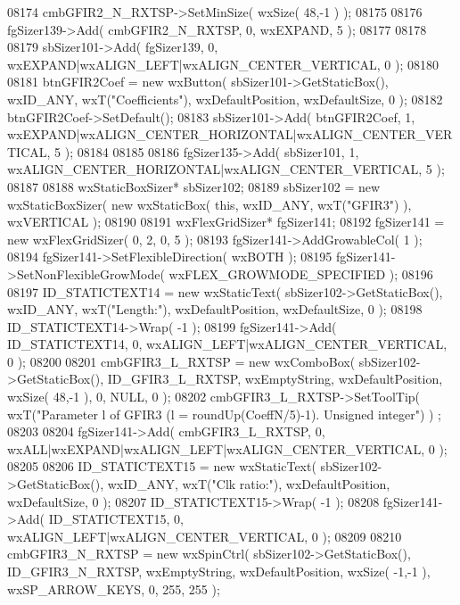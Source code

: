 \begin{DoxyCode}
08174     cmbGFIR2_N_RXTSP->SetMinSize( wxSize( 48,-1 ) );
08175     
08176     fgSizer139->Add( cmbGFIR2_N_RXTSP, 0, wxEXPAND, 5 );
08177     
08178     
08179     sbSizer101->Add( fgSizer139, 0, wxEXPAND|wxALIGN\_LEFT|wxALIGN\_CENTER\_VERTICAL, 0 );
08180     
08181     btnGFIR2Coef = \textcolor{keyword}{new} wxButton( sbSizer101->GetStaticBox(), wxID\_ANY, wxT(\textcolor{stringliteral}{"Coefficients"}), 
      wxDefaultPosition, wxDefaultSize, 0 );
08182     btnGFIR2Coef->SetDefault(); 
08183     sbSizer101->Add( btnGFIR2Coef, 1, wxEXPAND|wxALIGN\_CENTER\_HORIZONTAL|wxALIGN\_CENTER\_VERTICAL, 5 );
08184     
08185     
08186     fgSizer135->Add( sbSizer101, 1, wxALIGN\_CENTER\_HORIZONTAL|wxALIGN\_CENTER\_VERTICAL, 5 );
08187     
08188     wxStaticBoxSizer* sbSizer102;
08189     sbSizer102 = \textcolor{keyword}{new} wxStaticBoxSizer( \textcolor{keyword}{new} wxStaticBox( \textcolor{keyword}{this}, wxID\_ANY, wxT(\textcolor{stringliteral}{"GFIR3"}) ), wxVERTICAL );
08190     
08191     wxFlexGridSizer* fgSizer141;
08192     fgSizer141 = \textcolor{keyword}{new} wxFlexGridSizer( 0, 2, 0, 5 );
08193     fgSizer141->AddGrowableCol( 1 );
08194     fgSizer141->SetFlexibleDirection( wxBOTH );
08195     fgSizer141->SetNonFlexibleGrowMode( wxFLEX\_GROWMODE\_SPECIFIED );
08196     
08197     ID_STATICTEXT14 = \textcolor{keyword}{new} wxStaticText( sbSizer102->GetStaticBox(), wxID\_ANY, wxT(\textcolor{stringliteral}{"Length:"}), 
      wxDefaultPosition, wxDefaultSize, 0 );
08198     ID_STATICTEXT14->Wrap( -1 );
08199     fgSizer141->Add( ID_STATICTEXT14, 0, wxALIGN\_LEFT|wxALIGN\_CENTER\_VERTICAL, 0 );
08200     
08201     cmbGFIR3_L_RXTSP = \textcolor{keyword}{new} wxComboBox( sbSizer102->GetStaticBox(), 
      ID_GFIR3_L_RXTSP, wxEmptyString, wxDefaultPosition, wxSize( 48,-1 ), 0, NULL, 0 ); 
08202     cmbGFIR3_L_RXTSP->SetToolTip( wxT(\textcolor{stringliteral}{"Parameter l of GFIR3 (l = roundUp(CoeffN/5)-1). Unsigned integer"}) )
      ;
08203     
08204     fgSizer141->Add( cmbGFIR3_L_RXTSP, 0, wxALL|wxEXPAND|wxALIGN\_LEFT|wxALIGN\_CENTER\_VERTICAL, 0 );
08205     
08206     ID_STATICTEXT15 = \textcolor{keyword}{new} wxStaticText( sbSizer102->GetStaticBox(), wxID\_ANY, wxT(\textcolor{stringliteral}{"Clk ratio:"}), 
      wxDefaultPosition, wxDefaultSize, 0 );
08207     ID_STATICTEXT15->Wrap( -1 );
08208     fgSizer141->Add( ID_STATICTEXT15, 0, wxALIGN\_LEFT|wxALIGN\_CENTER\_VERTICAL, 0 );
08209     
08210     cmbGFIR3_N_RXTSP = \textcolor{keyword}{new} wxSpinCtrl( sbSizer102->GetStaticBox(), 
      ID_GFIR3_N_RXTSP, wxEmptyString, wxDefaultPosition, wxSize( -1,-1 ), wxSP\_ARROW\_KEYS, 0, 255, 255 );

\end{DoxyCode}
